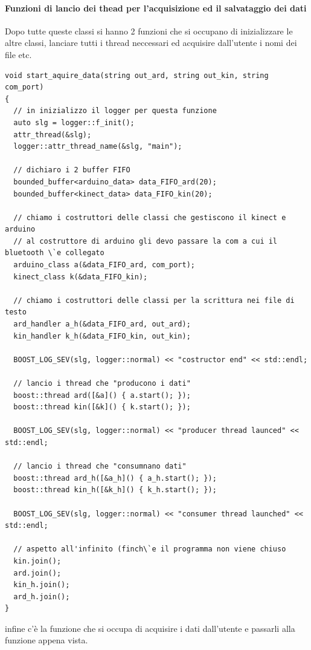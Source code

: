 \documentclass[10pt,a4paper]{article}
\begin{document}
\paragraph{Funzioni di lancio dei thead per l'acquisizione ed il salvataggio dei dati}
Dopo tutte queste classi si hanno 2 funzioni che si occupano di inizializzare le altre classi, lanciare tutti i thread neccessari ed acquisire dall'utente i nomi dei file etc.
\begin{lstlisting}[style=mycpp, caption=funzione start\_aquire\_data, captionpos=b]
void start_aquire_data(string out_ard, string out_kin, string com_port)
{
  // in inizializzo il logger per questa funzione
  auto slg = logger::f_init();
  attr_thread(&slg);
  logger::attr_thread_name(&slg, "main");

  // dichiaro i 2 buffer FIFO
  bounded_buffer<arduino_data> data_FIFO_ard(20);
  bounded_buffer<kinect_data> data_FIFO_kin(20);

  // chiamo i costruttori delle classi che gestiscono il kinect e arduino
  // al costruttore di arduino gli devo passare la com a cui il bluetooth \`e collegato
  arduino_class a(&data_FIFO_ard, com_port);
  kinect_class k(&data_FIFO_kin);

  // chiamo i costruttori delle classi per la scrittura nei file di testo
  ard_handler a_h(&data_FIFO_ard, out_ard);
  kin_handler k_h(&data_FIFO_kin, out_kin);

  BOOST_LOG_SEV(slg, logger::normal) << "costructor end" << std::endl;

  // lancio i thread che "producono i dati"
  boost::thread ard([&a]() { a.start(); });
  boost::thread kin([&k]() { k.start(); });

  BOOST_LOG_SEV(slg, logger::normal) << "producer thread launced" << std::endl;

  // lancio i thread che "consumnano dati"
  boost::thread ard_h([&a_h]() { a_h.start(); });
  boost::thread kin_h([&k_h]() { k_h.start(); });

  BOOST_LOG_SEV(slg, logger::normal) << "consumer thread launched" << std::endl;

  // aspetto all'infinito (finch\`e il programma non viene chiuso
  kin.join();
  ard.join();
  kin_h.join();
  ard_h.join();
}
\end{lstlisting}
%
%
infine c'\`e la funzione che si occupa di acquisire i dati dall'utente e passarli alla funzione appena vista.
\end{document}
